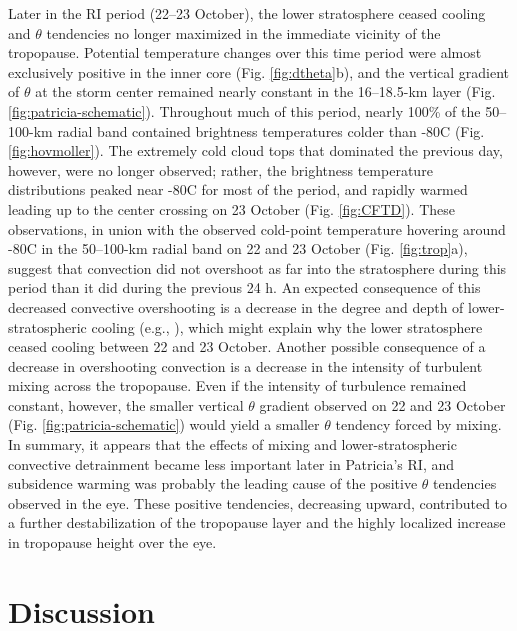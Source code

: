 Later in the RI period (22--23 October), the lower stratosphere ceased cooling and $\theta$ tendencies no longer maximized in the immediate vicinity of the tropopause.
Potential temperature changes over this time period were almost exclusively positive in the inner core (Fig. \ref{fig:dtheta}b), and the vertical gradient of $\theta$ at the storm center remained nearly constant in the 16--18.5-km layer (Fig. \ref{fig:patricia-schematic}).
Throughout much of this period, nearly 100\% of the 50--100-km radial band contained brightness temperatures colder than -80\textdegree{}C (Fig. \ref{fig:hovmoller}).
The extremely cold cloud tops that dominated the previous day, however, were no longer observed; rather, the brightness temperature distributions peaked near -80\textdegree{}C for most of the period, and rapidly warmed leading up to the center crossing on 23 October (Fig. \ref{fig:CFTD}).
These observations, in union with the observed cold-point temperature hovering around -80\textdegree{}C in the 50--100-km radial band on 22 and 23 October (Fig. \ref{fig:trop}a), suggest that convection did not overshoot as far into the stratosphere during this period than it did during the previous 24 h.
An expected consequence of this decreased convective overshooting is a decrease in the degree and depth of lower-stratospheric cooling (e.g., \citeauthor{KuangBretherton2004} \citeyear{KuangBretherton2004}), which might explain why the lower stratosphere ceased cooling between 22 and 23 October.
Another possible consequence of a decrease in overshooting convection is a decrease in the intensity of turbulent mixing across the tropopause.
Even if the intensity of turbulence remained constant, however, the smaller vertical $\theta$ gradient observed on 22 and 23 October (Fig. \ref{fig:patricia-schematic}) would yield a smaller $\theta$ tendency forced by mixing.
In summary, it appears that the effects of mixing and lower-stratospheric convective detrainment became less important later in Patricia’s RI, and subsidence warming was probably the leading cause of the positive $\theta$ tendencies observed in the eye.
These positive tendencies, decreasing upward, contributed to a further destabilization of the tropopause layer and the highly localized increase in tropopause height over
the eye.

\section{Discussion}
\label{sec:patricia-discussion}

